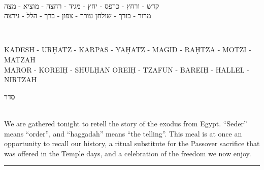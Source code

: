 \documentclass[letter,11pt,openany]{memoir}
\newcommand{\hchapter}[1]{
  \begin{hebrew}
    \begin{Spacing}{.97}
      \newpage
      \strut

      \vspace{.15em}

      \begin{flushleft}
      \noindent\Huge #1
      \end{flushleft}

      \vspace{1em}
    \end{Spacing}
  \end{hebrew}
}
\newcommand{\HgFill}{\vfill \hrule \vfill}
\newenvironment{HgEnglish}{\strut\\\noindent}{\vspace{1em}}
\newenvironment{HgTranslit}{\strut\\\noindent\begin{itshape}}{\end{itshape}\vspace{1em}}
\newenvironment{HgHebrew}{\begin{hebrew}\strut\\\noindent\LARGE}{\end{hebrew}}
\begin{document}
\vspace{-2em}
\begin{HgHebrew}
  \begin{center}
  קדש 
  -
  ורחץ
  -
  כרפס 
  -
  יחץ 
  -
  מגיד 
  -
  רחצה 
  -
  מוציא
  -
  מצה 
  \\
  מרור 
  -
  כורך 
  -
  שולחן עורך 
  -
  צפון
  -
  ברך 
  -
  הלל 
  -
  נירצה 
  \end{center}
\end{HgHebrew}
\begin{HgTranslit}
  \begin{center}
  {\footnotesize 
    KADESH - UR\d{H}ATZ - KARPAS - YA\d{H}ATZ - %
    MAGID - RA\d{H}TZA - MOTZI - MATZAH \\ 
    MAROR - KOREI\d{H} - SHUL\d{H}AN OREI\d{H} - %
    TZAFUN - BAREI\d{H} - HALLEL - NIRTZAH}
  \end{center}
\end{HgTranslit}

\vfill

\hchapter{סדר}

\vfill

\begin{HgEnglish}
  We are gathered tonight to retell the story of the exodus from Egypt.
  ``Seder'' means ``order'', and ``haggadah'' means ``the telling''. This meal
  is at once an opportunity to recall our history, a ritual substitute for the
  Passover sacrifice that was offered in the Temple days, and a celebration of
  the freedom we now enjoy.
\end{HgEnglish}

\HgFill
\end{document}
